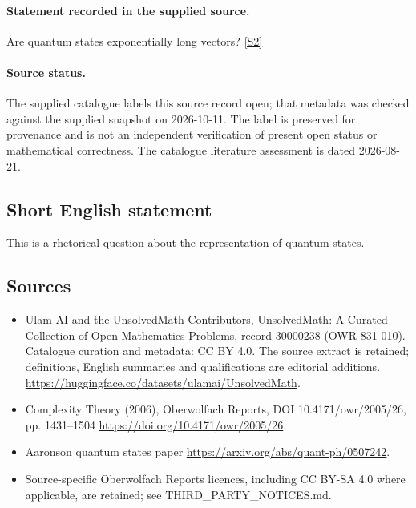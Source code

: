 \documentclass[11pt]{article}
\newcommand{\sref}[2]{\hyperlink{source:#1:#2}{[S#2]}}
\begin{document}
\paragraph{Statement recorded in the supplied source.}
Are quantum states exponentially long vectors? \sref{30000238}{2}
\paragraph{Source status.}
The supplied catalogue labels this source record open; that metadata was checked against the supplied snapshot on 2026-10-11. The label is preserved for provenance and is not an independent verification of present open status or mathematical correctness. The catalogue literature assessment is dated 2026-08-21.
\subsection{Short English statement}
This is a rhetorical question about the representation of quantum states.
\subsection{Sources}
\begin{itemize}
\item[\hypertarget{source:30000238:1}{S1}] Ulam AI and the UnsolvedMath Contributors, UnsolvedMath: A Curated Collection of Open Mathematics Problems, record 30000238 (OWR-831-010). Catalogue curation and metadata: CC BY 4.0. The source extract is retained; definitions, English summaries and qualifications are editorial additions.
\url{https://huggingface.co/datasets/ulamai/UnsolvedMath}.
\item[\hypertarget{source:30000238:2}{S2}] Complexity Theory (2006), Oberwolfach Reports, DOI 10.4171/owr/2005/26, pp. 1431--1504
\url{https://doi.org/10.4171/owr/2005/26}.
\item[\hypertarget{source:30000238:3}{S3}] Aaronson quantum states paper
\url{https://arxiv.org/abs/quant-ph/0507242}.
\item Source-specific Oberwolfach Reports licences, including CC BY-SA 4.0 where applicable, are retained; see THIRD\_PARTY\_NOTICES.md.
\end{itemize}
\end{document}
